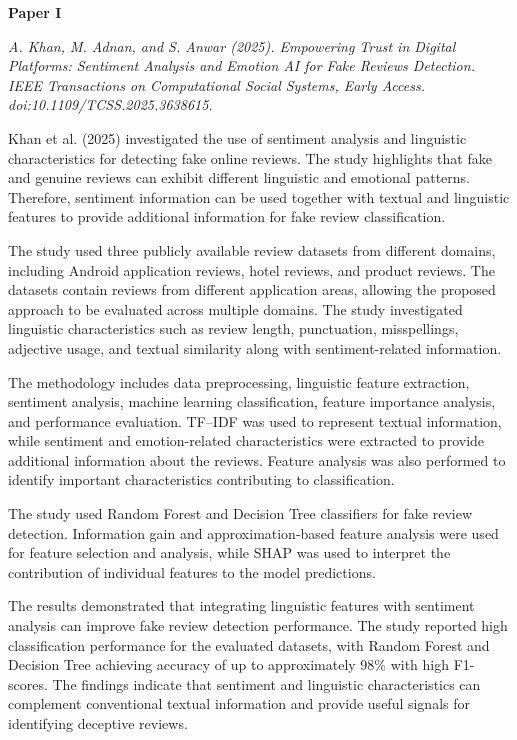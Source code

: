 \documentclass[12pt,a4paper]{report}
\begin{document}

\textbf{Paper I}

\textit{A. Khan, M. Adnan, and S. Anwar (2025). Empowering Trust in Digital Platforms: Sentiment Analysis and Emotion AI for Fake Reviews Detection. IEEE Transactions on Computational Social Systems, Early Access. doi:10.1109/TCSS.2025.3638615.}

Khan et al. (2025) investigated the use of sentiment analysis and linguistic characteristics for detecting fake online reviews. The study highlights that fake and genuine reviews can exhibit different linguistic and emotional patterns. Therefore, sentiment information can be used together with textual and linguistic features to provide additional information for fake review classification.

The study used three publicly available review datasets from different domains, including Android application reviews, hotel reviews, and product reviews. The datasets contain reviews from different application areas, allowing the proposed approach to be evaluated across multiple domains. The study investigated linguistic characteristics such as review length, punctuation, misspellings, adjective usage, and textual similarity along with sentiment-related information.

The methodology includes data preprocessing, linguistic feature extraction, sentiment analysis, machine learning classification, feature importance analysis, and performance evaluation. TF--IDF was used to represent textual information, while sentiment and emotion-related characteristics were extracted to provide additional information about the reviews. Feature analysis was also performed to identify important characteristics contributing to classification.

The study used Random Forest and Decision Tree classifiers for fake review detection. Information gain and approximation-based feature analysis were used for feature selection and analysis, while SHAP was used to interpret the contribution of individual features to the model predictions.

The results demonstrated that integrating linguistic features with sentiment analysis can improve fake review detection performance. The study reported high classification performance for the evaluated datasets, with Random Forest and Decision Tree achieving accuracy of up to approximately 98\% with high F1-scores. The findings indicate that sentiment and linguistic characteristics can complement conventional textual information and provide useful signals for identifying deceptive reviews.
\end{document}
